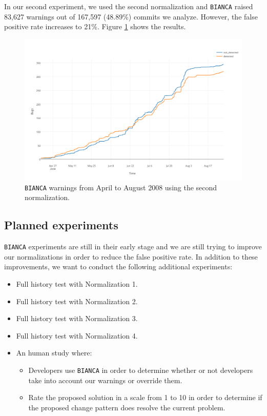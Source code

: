 In our second experiment, we used the second normalization and {\tt BIANCA} raised 83,627 warnings out of 167,597 (48.89\%) commits we analyze. However, the false positive rate increases to 21\%. Figure \ref{fig:bianca-exp-2} shows the results.

\begin{figure}[h!]
  \centering
    \includegraphics[scale=0.55]{media/bianca-20.png}
    \caption{{\tt BIANCA} warnings from April to August 2008 using the second normalization.
    \label{fig:bianca-exp-2}}
\end{figure}

\subsection{Planned experiments}

{\tt BIANCA} experiments are still in their early stage and we are still trying to improve our normalizations in order to reduce the false positive rate. In addition to these improvements, we want to conduct the following additional experiments:

\begin{itemize}
	\item Full history test with Normalization 1.
	\item Full history test with Normalization 2.
	\item Full history test with Normalization 3.
	\item Full history test with Normalization 4.
	\item An human study where:
	\begin{itemize}
		\item  Developers use {\tt BIANCA} in order to determine whether or not developers take into account our warnings or override them.
		\item Rate the proposed solution in a scale from 1 to 10 in order to determine if the proposed change pattern does resolve the current problem.
	\end{itemize}
\end{itemize}
